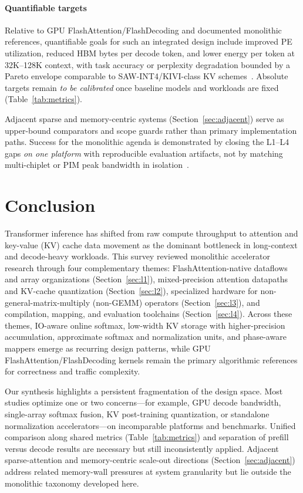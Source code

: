 \documentclass[conference]{IEEEtran}
\begin{document}
\paragraph{Quantifiable targets}
Relative to GPU FlashAttention/FlashDecoding and documented monolithic references, quantifiable goals for such an integrated design include improved PE utilization, reduced HBM bytes per decode token, and lower energy per token at 32K--128K context, with task accuracy or perplexity degradation bounded by a Pareto envelope comparable to SAW-INT4/KIVI-class KV schemes~\cite{sawint42026,liu2024kivi,dao2023flashdecoding}.
Absolute targets remain \emph{to be calibrated} once baseline models and workloads are fixed (Table~\ref{tab:metrics}).

Adjacent sparse and memory-centric systems (Section~\ref{sec:adjacent}) serve as upper-bound comparators and scope guards rather than primary implementation paths.
Success for the monolithic agenda is demonstrated by closing the L1--L4 gaps \emph{on one platform} with reproducible evaluation artifacts, not by matching multi-chiplet or PIM peak bandwidth in isolation~\cite{amma2026,salca2026,plena2025}.

\section{Conclusion}
\label{sec:conclusion}

Transformer inference has shifted from raw compute throughput to attention and key-value (KV) cache data movement as the dominant bottleneck in long-context and decode-heavy workloads.
This survey reviewed monolithic accelerator research through four complementary themes: FlashAttention-native dataflows and array organizations (Section~\ref{sec:l1}), mixed-precision attention datapaths and KV-cache quantization (Section~\ref{sec:l2}), specialized hardware for non-general-matrix-multiply (non-GEMM) operators (Section~\ref{sec:l3}), and compilation, mapping, and evaluation toolchains (Section~\ref{sec:l4}).
Across these themes, IO-aware online softmax, low-width KV storage with higher-precision accumulation, approximate softmax and normalization units, and phase-aware mappers emerge as recurring design patterns, while GPU FlashAttention/FlashDecoding kernels remain the primary algorithmic references for correctness and traffic complexity.

Our synthesis highlights a persistent fragmentation of the design space.
Most studies optimize one or two concerns---for example, GPU decode bandwidth, single-array softmax fusion, KV post-training quantization, or standalone normalization accelerators---on incomparable platforms and benchmarks.
Unified comparison along shared metrics (Table~\ref{tab:metrics}) and separation of prefill versus decode results are necessary but still inconsistently applied.
Adjacent sparse-attention and memory-centric scale-out directions (Section~\ref{sec:adjacent}) address related memory-wall pressures at system granularity but lie outside the monolithic taxonomy developed here.
\end{document}
